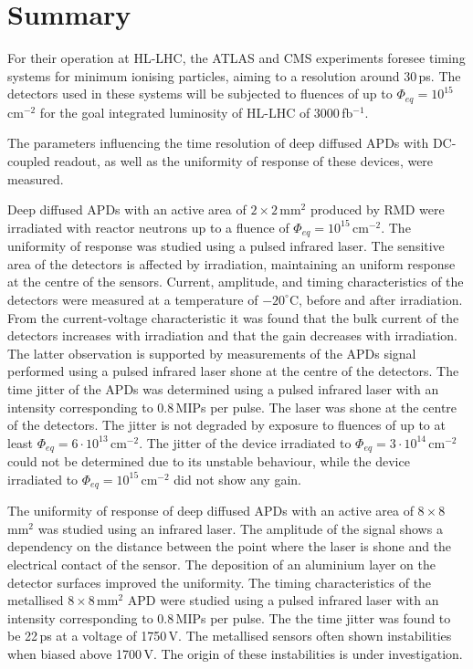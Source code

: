 \documentclass{article}
\begin{document}
\section{Summary}
\label{sec:summary}

For their operation at HL-LHC, the ATLAS and CMS experiments foresee timing systems for minimum ionising particles, aiming to a resolution around 30\,ps.
The detectors used in these systems will be subjected to fluences of up to $\Phi_{eq} = 10^{15}$\,cm$^{-2}$ for the goal integrated luminosity of HL-LHC of 3000\,fb$^{-1}$.

The parameters influencing the time resolution of deep diffused APDs with DC-coupled readout, as well as the uniformity of response of these devices, were measured.

Deep diffused APDs with an active area of $2 \times 2$\,mm$^2$ produced by RMD were irradiated with reactor neutrons up to a fluence of $\Phi_{eq} = 10^{15}$\,cm$^{-2}$.
The uniformity of response was studied using a pulsed infrared laser.
The sensitive area of the detectors is affected by irradiation, maintaining an uniform response at the centre of the sensors.
Current, amplitude, and timing characteristics of the detectors were measured at a temperature of $-20^\circ$C, before and after irradiation.
From the current-voltage characteristic it was found that the bulk current of the detectors increases with irradiation and that the gain decreases with irradiation.
The latter observation is supported by measurements of the APDs signal performed using a pulsed infrared laser shone at the centre of the detectors.
The time jitter of the APDs was determined using a pulsed infrared laser with an intensity corresponding to 0.8\,MIPs per pulse.
The laser was shone at the centre of the detectors.
The jitter is not degraded by exposure to fluences of up to at least $\Phi_{eq} = 6 \cdot 10^{13}$\,cm$^{-2}$.
The jitter of the device irradiated to $\Phi_{eq} = 3 \cdot 10^{14}$\,cm$^{-2}$ could not be determined due to its unstable behaviour, while the device irradiated to $\Phi_{eq} = 10^{15}$\,cm$^{-2}$ did not show any gain.


The uniformity of response of deep diffused APDs with an active area of $8 \times 8$\,mm$^2$ was studied using an infrared laser.
The amplitude of the signal shows a dependency on the distance between the point where the laser is shone and the electrical contact of the sensor.
The deposition of an aluminium layer on the detector surfaces improved the uniformity.
The timing characteristics of the metallised $8 \times 8$\,mm$^2$ APD were studied using a pulsed infrared laser with an intensity corresponding to 0.8\,MIPs per pulse.
The the time jitter was found to be 22\,ps at a voltage of 1750\,V.
The metallised sensors often shown instabilities when biased above 1700\,V.
The origin of these instabilities is under investigation.
\end{document}
